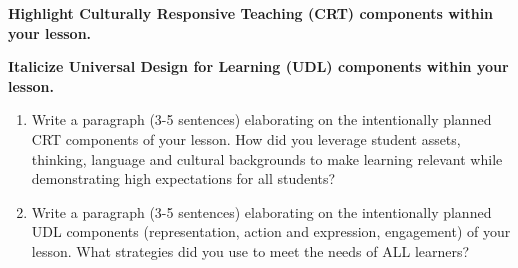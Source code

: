 \documentclass{article}
\begin{document}
\textbf{Highlight Culturally Responsive Teaching (CRT) components within your lesson.} 

\textbf{Italicize Universal Design for Learning (UDL) components within your lesson. }

\begin{enumerate}
    \item Write a paragraph (3-5 sentences) elaborating on the intentionally planned CRT components of your lesson. How did you leverage student assets, thinking, language and cultural backgrounds to make learning relevant while demonstrating high expectations for all students? 
    \item Write a paragraph (3-5 sentences) elaborating on the intentionally planned UDL components (representation, action and expression, engagement) of your lesson. What strategies did you use to meet the needs of ALL learners? 

\end{enumerate}
\end{document}
